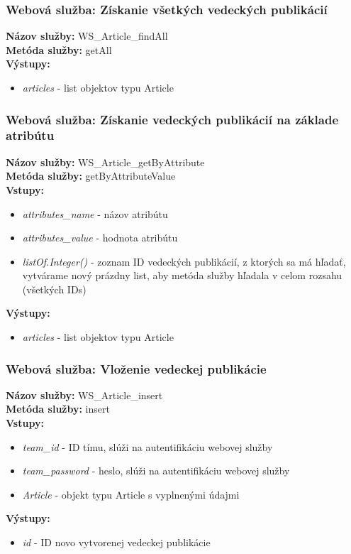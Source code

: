 \documentclass[10pt,oneside,slovak,a4paper]{article}
\begin{document}
\subsubsection{Webová služba: Získanie všetkých vedeckých publikácií}
\textbf{Názov služby:}  WS\_Article\_findAll\\
\textbf{Metóda služby:} getAll\\
\textbf{Výstupy:}\\
	\begin{itemize}
		\item \textit{articles} - list objektov typu Article
	\end{itemize}
	
\subsubsection{Webová služba: Získanie vedeckých publikácií na základe atribútu}
\textbf{Názov služby:} WS\_Article\_getByAttribute\\
\textbf{Metóda služby:} getByAttributeValue\\
\textbf{Vstupy:}\\
	\begin{itemize}
		\item \textit{attributes\_name} - názov atribútu
		\item \textit{attributes\_value} - hodnota atribútu
		\item \textit{listOf.Integer()} - zoznam ID vedeckých publikácií, z ktorých sa má hľadať, vytvárame nový prázdny list, aby metóda služby hľadala v celom rozsahu (všetkých IDs)
	\end{itemize}
\textbf{Výstupy:}
	\begin{itemize}
		\item \textit{articles} - list objektov typu Article
	\end{itemize}
	
\subsubsection{Webová služba: Vloženie vedeckej publikácie}
\textbf{Názov služby:} WS\_Article\_insert\\
\textbf{Metóda služby:} insert\\
\textbf{Vstupy:}\\
	\begin{itemize}
		\item \textit{team\_id} - ID tímu, slúži na autentifikáciu webovej služby
		\item \textit{team\_password} - heslo, slúži na autentifikáciu webovej služby
		\item \textit{Article} - objekt typu Article s vyplnenými údajmi
	\end{itemize}
\textbf{Výstupy:}
	\begin{itemize}
		\item \textit{id} - ID novo vytvorenej vedeckej publikácie
	\end{itemize}
	
\end{document}
